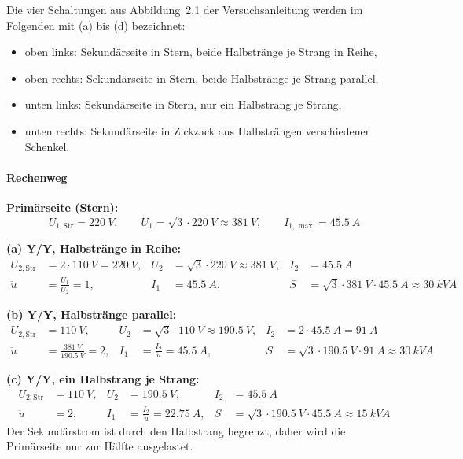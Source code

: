 \documentclass[a4paper,11pt]{scrreprt}
\newcommand{\ue}{\ddot{u}}
\begin{document}
Die vier Schaltungen aus Abbildung~2.1 der Versuchsanleitung werden im Folgenden mit (a) bis (d) bezeichnet:
\begin{itemize}[nosep]
  \item[(a)] oben links: Sekundärseite in Stern, beide Halbstränge je Strang in Reihe,
  \item[(b)] oben rechts: Sekundärseite in Stern, beide Halbstränge je Strang parallel,
  \item[(c)] unten links: Sekundärseite in Stern, nur ein Halbstrang je Strang,
  \item[(d)] unten rechts: Sekundärseite in Zickzack aus Halbsträngen verschiedener Schenkel.
\end{itemize}

\paragraph{Rechenweg}

\textbf{Primärseite (Stern):}
\begin{equation*}
  U_{1,\mathrm{Str}} = \SI{220}{V}, \qquad
  U_{1} = \sqrt{3}\cdot\SI{220}{V} \approx \SI{381}{V}, \qquad
  I_{1,\max} = \SI{45.5}{A}
\end{equation*}

\textbf{(a) Y/Y, Halbstränge in Reihe:}
\begin{align*}
  U_{2,\mathrm{Str}} &= 2\cdot\SI{110}{V} = \SI{220}{V}, &
  U_2 &= \sqrt{3}\cdot\SI{220}{V} \approx \SI{381}{V}, &
  I_2 &= \SI{45.5}{A}\\
  \ue &= \frac{U_1}{U_2} = 1, &
  I_1 &= \SI{45.5}{A}, &
  S &= \sqrt{3}\cdot\SI{381}{V}\cdot\SI{45.5}{A} \approx \SI{30}{kVA}
\end{align*}

\textbf{(b) Y/Y, Halbstränge parallel:}
\begin{align*}
  U_{2,\mathrm{Str}} &= \SI{110}{V}, &
  U_2 &= \sqrt{3}\cdot\SI{110}{V} \approx \SI{190.5}{V}, &
  I_2 &= 2\cdot\SI{45.5}{A} = \SI{91}{A}\\
  \ue &= \frac{\SI{381}{V}}{\SI{190.5}{V}} = 2, &
  I_1 &= \frac{I_2}{\ue} = \SI{45.5}{A}, &
  S &= \sqrt{3}\cdot\SI{190.5}{V}\cdot\SI{91}{A} \approx \SI{30}{kVA}
\end{align*}

\textbf{(c) Y/Y, ein Halbstrang je Strang:}
\begin{align*}
  U_{2,\mathrm{Str}} &= \SI{110}{V}, &
  U_2 &= \SI{190.5}{V}, &
  I_2 &= \SI{45.5}{A}\\
  \ue &= 2, &
  I_1 &= \frac{I_2}{\ue} = \SI{22.75}{A}, &
  S &= \sqrt{3}\cdot\SI{190.5}{V}\cdot\SI{45.5}{A} \approx \SI{15}{kVA}
\end{align*}
Der Sekundärstrom ist durch den Halbstrang begrenzt, daher wird die Primärseite nur zur Hälfte ausgelastet.
\end{document}
